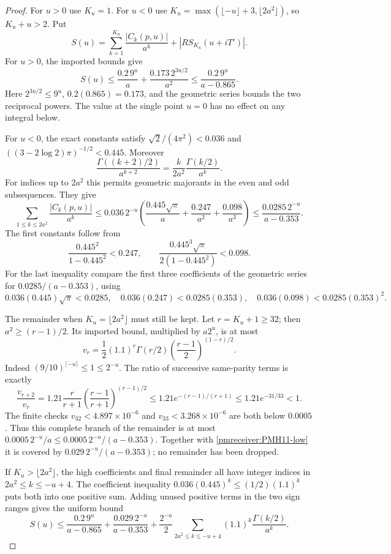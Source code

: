 \documentclass[11pt]{article}
\begin{document}
\begin{proof}
For $u>0$ use $K_u=1$. For $u<0$ use
$K_u=\max(\lfloor-u\rfloor+3,\lfloor2a^2\rfloor)$, so
$K_u+u>2$. Put
\[
 S(u)=\sum_{k=1}^{K_u}\frac{|C_k(p,u)|}{a^k}
            +|RS_{K_u}(u+iT')|.
\]
For $u>0$, the imported bounds give
\[
 S(u)\le\frac{0.2\,9^u}{a}+\frac{0.173\,2^{3u/2}}{a^2}
 \le\frac{0.2\,9^u}{a-0.865}.
\]
Here $2^{3u/2}\le9^u$, $0.2(0.865)=0.173$, and the geometric
series bounds the two reciprocal powers. The value at the single
point $u=0$ has no effect on any integral below.

For $u<0$, the exact constants satisfy
$\sqrt2/(4\pi^2)<0.036$ and
$((3-2\log2)\pi)^{-1/2}<0.445$. Moreover
\[
 \frac{\Gamma((k+2)/2)}{a^{k+2}}
 =\frac{k}{2a^2}\frac{\Gamma(k/2)}{a^k}.
\]
For indices up to $2a^2$ this permits geometric majorants in the
even and odd subsequences. They give
\begin{equation}\label{pmreceiver:PMH11-low}
 \sum_{1\le k\le2a^2}\frac{|C_k(p,u)|}{a^k}
 \le0.036\,2^{-u}
 \left(\frac{0.445\sqrt\pi}{a}+\frac{0.247}{a^2}
                         +\frac{0.098}{a^3}\right)
 \le\frac{0.0285\,2^{-u}}{a-0.353}.
\end{equation}
The first constants follow from
\[
 \frac{0.445^2}{1-0.445^2}<0.247,\qquad
 \frac{0.445^3\sqrt\pi}{2(1-0.445^2)}<0.098.
\]
For the last inequality compare the first three coefficients of
the geometric series for $0.0285/(a-0.353)$, using
\[
 0.036(0.445)\sqrt\pi<0.0285,\quad
 0.036(0.247)<0.0285(0.353),\quad
 0.036(0.098)<0.0285(0.353)^2.
\]

The remainder when $K_u=\lfloor2a^2\rfloor$ must still be kept.
Let $r=K_u+1\ge32$; then $a^2\ge(r-1)/2$. Its imported bound,
multiplied by $a2^u$, is at most
\[
 v_r=\frac12(1.1)^r\Gamma(r/2)
       \left(\frac{r-1}{2}\right)^{(1-r)/2}.
\]
Indeed $(9/10)^{\lceil-u\rceil}\le1\le2^{-u}$.
The ratio of successive same-parity terms is exactly
\[
 \frac{v_{r+2}}{v_r}=1.21\frac r{r+1}
       \left(\frac{r-1}{r+1}\right)^{(r-1)/2}
 \le1.21e^{-(r-1)/(r+1)}\le1.21e^{-31/33}<1.
\]
The finite checks $v_{32}<4.897\times10^{-6}$ and
$v_{33}<3.268\times10^{-6}$ are both below $0.0005$.
Thus this complete branch of the remainder is at most
$0.0005\,2^{-u}/a\le0.0005\,2^{-u}/(a-0.353)$.
Together with \eqref{pmreceiver:PMH11-low} it is covered by
$0.029\,2^{-u}/(a-0.353)$; no remainder has been dropped.

If $K_u>\lfloor2a^2\rfloor$, the high coefficients and final
remainder all have integer indices in $2a^2\le k\le-u+4$.
The coefficient inequality $0.036(0.445)^k\le(1/2)(1.1)^k$
puts both into one positive sum. Adding unused positive terms in
the two sign ranges gives the uniform bound
\begin{equation}\label{pmreceiver:PMH11-S}
 S(u)\le\frac{0.2\,9^u}{a-0.865}+\frac{0.029\,2^{-u}}{a-0.353}
       +\frac{2^{-u}}2
          \sum_{2a^2\le k\le-u+4}(1.1)^k\frac{\Gamma(k/2)}{a^k}.
\end{equation}


\end{proof}
\end{document}
